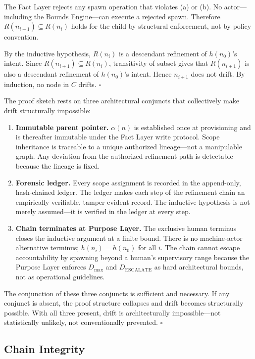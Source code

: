 The Fact Layer rejects any spawn operation that violates (a) or (b). No actor---including the Bounds Engine---can execute a rejected spawn. Therefore $R(n_{i+1}) \subseteq R(n_i)$ holds for the child by structural enforcement, not by policy convention.

By the inductive hypothesis, $R(n_i)$ is a descendant refinement of $h(n_0)$'s intent. Since $R(n_{i+1}) \subseteq R(n_i)$, transitivity of subset gives that $R(n_{i+1})$ is also a descendant refinement of $h(n_0)$'s intent. Hence $n_{i+1}$ does not drift. By induction, no node in $C$ drifts. $\square$

\medskip
The proof sketch rests on three architectural conjuncts that collectively make drift structurally impossible:

\begin{enumerate}
    \item[(1)] \textbf{Immutable parent pointer.} $\alpha(n)$ is established once at provisioning and is thereafter immutable under the Fact Layer write protocol. Scope inheritance is traceable to a unique authorized lineage---not a manipulable graph. Any deviation from the authorized refinement path is detectable because the lineage is fixed.
    \item[(2)] \textbf{Forensic ledger.} Every scope assignment is recorded in the append-only, hash-chained ledger. The ledger makes each step of the refinement chain an empirically verifiable, tamper-evident record. The inductive hypothesis is not merely assumed---it is verified in the ledger at every step.
    \item[(3)] \textbf{Chain terminates at Purpose Layer.} The exclusive human terminus closes the inductive argument at a finite bound. There is no machine-actor alternative terminus; $h(n_i) = h(n_0)$ for all $i$. The chain cannot escape accountability by spawning beyond a human's supervisory range because the Purpose Layer enforces $D_{\mathrm{max}}$ and $D_{\mathrm{ESCALATE}}$ as hard architectural bounds, not as operational guidelines.
\end{enumerate}

The conjunction of these three conjuncts is sufficient and necessary. If any conjunct is absent, the proof structure collapses and drift becomes structurally possible. With all three present, drift is architecturally impossible---not statistically unlikely, not conventionally prevented. $\square$

\subsection{Chain Integrity}
\label{sec:rs-chain-integrity}

